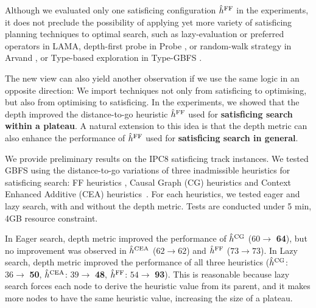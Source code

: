 Although we evaluated only one \sota satisficing configuration $\hat{h}^{\text{FF}}$ in
the experiments, it does not preclude the possibility of applying yet
more variety of satisficing planning techniques to optimal search, such as lazy-evaluation
or preferred operators in LAMA, depth-first probe in Probe \cite{LipovetzkyG11}, or
random-walk strategy in Arvand \cite{nakhost2009monte}, or Type-based
exploration in Type-GBFS \cite{xie14type}.

The new view can also yield another observation if we use the same logic
in an opposite direction: We import techniques not only from satisficing
to optimising, but also from optimising to satisficing.
In the experiments, we showed that the depth improved the distance-to-go \ff heuristic $\hat{h}^{\text{FF}}$
used for \textbf{satisficing search within a plateau}. A natural extension
to this idea is that the depth metric can also enhance the performance of
$\hat{h}^{\text{FF}}$ used for \textbf{satisficing search in general}.

We provide preliminary results on the IPC8 satisficing track
instances. We tested GBFS using the distance-to-go variations of three
\sota inadmissible heuristics for satisficing search: FF heuristics
 \cite{Hoffmann01}, Causal Graph (CG) heuristics \cite{Helmert2006} and
Context Enhanced Additive (CEA) heuristics\ \cite{helmert2008unifying}.
For each heuristics, we tested eager and lazy search, with and without
the depth metric.  Tests are conducted under 5 min, 4GB
resource constraint.

In Eager search, depth metric
improved the performance of $\hat{h}^{\text{CG}}$ ($60\rightarrow $ \textbf{64}), but no
improvement was observed in $\hat{h}^{\text{CEA}}$ ($62\rightarrow 62$)
and $\hat{h}^{\text{FF}}$ ($73\rightarrow 73$). In Lazy search, depth metric
improved the performance of all three heuristics
($\hat{h}^{\text{CG}}$: $36\rightarrow $ \textbf{50}, 
 $\hat{h}^{\text{CEA}}$: $39\rightarrow $ \textbf{48}, 
 $\hat{h}^{\text{FF}}$: $54\rightarrow $ \textbf{93}). This is reasonable
because lazy search forces each node to derive the heuristic value from
its parent, and it makes more nodes to have the same heuristic value,
increasing the size of a plateau.

%  

